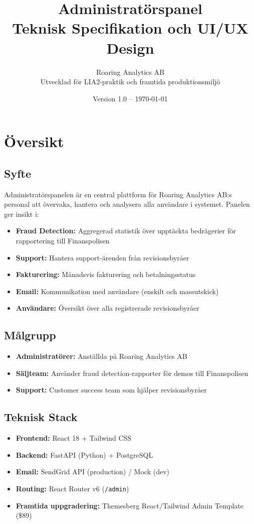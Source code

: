 \documentclass[12pt,a4paper]{article}
\title{\textbf{Administratörspanel}\\
\large Teknisk Specifikation och UI/UX Design}
\author{Roaring Analytics AB\\
Utvecklad för LIA2-praktik och framtida produktionsmiljö}
\date{Version 1.0 -- \today}
\begin{document}
\maketitle
\tableofcontents
\newpage

\section{Översikt}

\subsection{Syfte}
Administratörspanelen är en central plattform för Roaring Analytics AB:s personal att övervaka, hantera och analysera alla användare i systemet. Panelen ger insikt i:

\begin{itemize}[leftmargin=2cm]
  \item \textbf{Fraud Detection:} Aggregerad statistik över upptäckta bedrägerier för rapportering till Finanspolisen
  \item \textbf{Support:} Hantera support-ärenden från revisionsbyråer
  \item \textbf{Fakturering:} Månadsvis fakturering och betalningsstatus
  \item \textbf{Email:} Kommunikation med användare (enskilt och massutskick)
  \item \textbf{Användare:} Översikt över alla registrerade revisionsbyråer
\end{itemize}

\subsection{Målgrupp}
\begin{itemize}
  \item \textbf{Administratörer:} Anställda på Roaring Analytics AB
  \item \textbf{Säljteam:} Använder fraud detection-rapporter för demos till Finanspolisen
  \item \textbf{Support:} Customer success team som hjälper revisionsbyråer
\end{itemize}

\subsection{Teknisk Stack}
\begin{itemize}
  \item \textbf{Frontend:} React 18 + Tailwind CSS
  \item \textbf{Backend:} FastAPI (Python) + PostgreSQL
  \item \textbf{Email:} SendGrid API (production) / Mock (dev)
  \item \textbf{Routing:} React Router v6 (\texttt{/admin})
  \item \textbf{Framtida uppgradering:} Themesberg React/Tailwind Admin Template (\$89)
\end{itemize}
\end{document}
